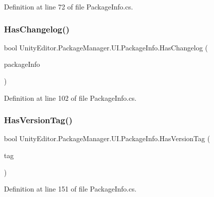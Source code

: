 Definition at line 72 of file Package\+Info.\+cs.

\mbox{\label{class_unity_editor_1_1_package_manager_1_1_u_i_1_1_package_info_addb2eb2857948538853897bf76743aea}} 
\subsubsection{\texorpdfstring{HasChangelog()}{HasChangelog()}}
{\footnotesize\ttfamily bool Unity\+Editor.\+Package\+Manager.\+U\+I.\+Package\+Info.\+Has\+Changelog (\begin{DoxyParamCaption}\item[{\mbox{\hyperlink{class_unity_editor_1_1_package_manager_1_1_u_i_1_1_package_info}{Package\+Info}}}]{package\+Info }\end{DoxyParamCaption})}



Definition at line 102 of file Package\+Info.\+cs.

\mbox{\label{class_unity_editor_1_1_package_manager_1_1_u_i_1_1_package_info_af0fa791bd7aa34dfec5f1dbdbddcb7dd}} 
\subsubsection{\texorpdfstring{HasVersionTag()}{HasVersionTag()}\hspace{0.1cm}{\footnotesize\ttfamily [1/2]}}
{\footnotesize\ttfamily bool Unity\+Editor.\+Package\+Manager.\+U\+I.\+Package\+Info.\+Has\+Version\+Tag (\begin{DoxyParamCaption}\item[{string}]{tag }\end{DoxyParamCaption})}



Definition at line 151 of file Package\+Info.\+cs.

